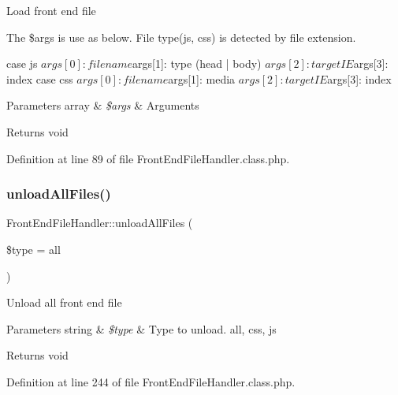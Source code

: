 Load front end file

The \$args is use as below. File type(js, css) is detected by file extension.


\begin{DoxyPre}
case js
        $args[0]: file name
        $args[1]: type (head | body)
        $args[2]: target IE
        $args[3]: index
case css
        $args[0]: file name
        $args[1]: media
        $args[2]: target IE
        $args[3]: index
\end{DoxyPre}



\begin{DoxyParams}[1]{Parameters}
array & {\em \$args} & Arguments \\
\hline
\end{DoxyParams}
\begin{DoxyReturn}{Returns}
void 
\end{DoxyReturn}


Definition at line 89 of file Front\+End\+File\+Handler.\+class.\+php.

\hypertarget{classFrontEndFileHandler_ad31d9887bc8b135b4b26f8fb225abe43}{}\label{classFrontEndFileHandler_ad31d9887bc8b135b4b26f8fb225abe43} 
\subsubsection{\texorpdfstring{unload\+All\+Files()}{unloadAllFiles()}}
{\footnotesize\ttfamily Front\+End\+File\+Handler\+::unload\+All\+Files (\begin{DoxyParamCaption}\item[{}]{\$type = {\ttfamily \textquotesingle{}all\textquotesingle{}} }\end{DoxyParamCaption})}

Unload all front end file


\begin{DoxyParams}[1]{Parameters}
string & {\em \$type} & Type to unload. all, css, js \\
\hline
\end{DoxyParams}
\begin{DoxyReturn}{Returns}
void 
\end{DoxyReturn}


Definition at line 244 of file Front\+End\+File\+Handler.\+class.\+php.

